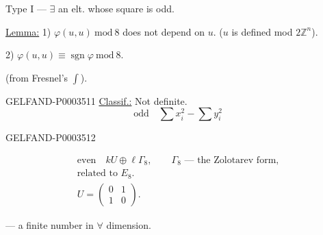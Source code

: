 Type $\mathrm I$ --- $\exists$ an elt. whose square is odd.

\uline{Lemma:} 1) $\varphi (u, u)\ \mathrm{mod}\ 8$ does not depend on $u$.
($u$ is defined mod $2\mathbb Z^n$).

2) $\varphi (u, u)\equiv\operatorname{sgn}\varphi\ \mathrm{mod}\ 8$.

(from Fresnel’s $\int$).

\begin{GelfandAdjacentEvidence}{GELFAND-P000351}{1}
\uline{Classif.:} Not definite.
\begin{equation*}\text{odd}\quad\sum x_i^2-\sum y_i^2\end{equation*}
\end{GelfandAdjacentEvidence}
\begin{GelfandAdjacentEvidence}{GELFAND-P000351}{2}




\end{GelfandAdjacentEvidence}

\begin{gather*}\text{even}\quad kU\oplus\ell\Gamma_8,\qquad\Gamma_8\text{ --- the Zolotarev form,}\\
\text{related to }E_8.\\
U=\begin{pmatrix}0&1\\1&0\end{pmatrix}.\end{gather*}

 --- a finite number in $\forall$ dimension.

